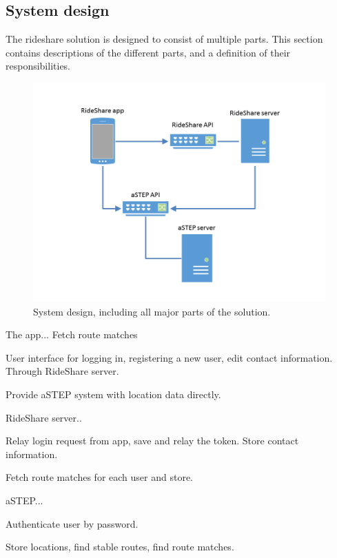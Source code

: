 \subsection{System design}
The rideshare solution is designed to consist of multiple parts.
This section contains descriptions of the different parts, and a definition of their responsibilities.

\begin{figure}[h]
	\centering
	\includegraphics[width=\textwidth]{figures/SystemDesign.png}
	\caption{System design, including all major parts of the solution.}
	\label{fig:s2systemdesign}
\end{figure}

The app...
Fetch route matches

User interface for logging in, registering a new user, edit contact information.
Through RideShare server.

Provide aSTEP system with location data directly.



RideShare server..

Relay login request from app, save and relay the token.
Store contact information. 

Fetch route matches for each user and store.



aSTEP...

Authenticate user by password.

Store locations, find stable routes, find route matches.
